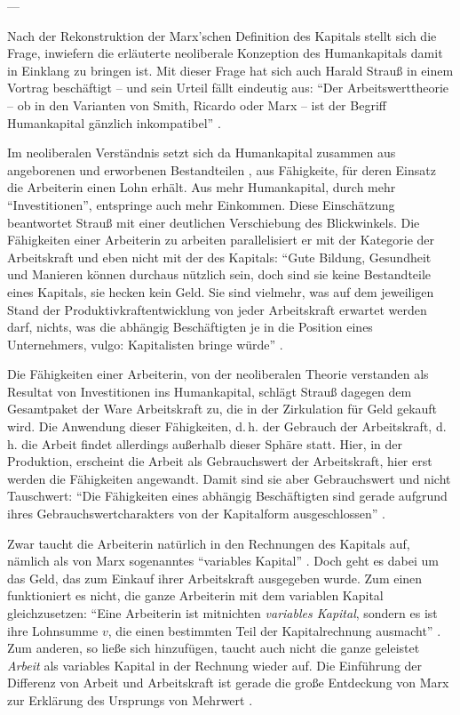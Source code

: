 \documentclass[12pt,
               DIV13,
               paper=a4,
               twoside=false,
               onehalfspacing,
               bibliography=totoc,
               toc=graduated,
               draft,
               ]{scrartcl}
\newcommand{\pc}[2]{\parencite[#1]{#2}}
\newcommand{\vgl}[2]{\parencite[vgl.][#1]{#2}}
\newcommand{\worries}[1]{\ifdraft{\textcolor{blue}{\texttt{(#1)}}}{}}
\begin{document}
---

Nach der Rekonstruktion der Marx'schen Definition des Kapitals stellt
sich die Frage, inwiefern die erläuterte neoliberale Konzeption des
Humankapitals damit in Einklang zu bringen ist. Mit dieser Frage hat
sich auch Harald Strauß in einem Vortrag beschäftigt -- und sein
Urteil fällt eindeutig aus: "`Der Arbeitswerttheorie -- ob in den
Varianten von Smith, Ricardo oder Marx -- ist der Begriff Humankapital
gänzlich inkompatibel"' \pc{124}{strauss}.

Im neoliberalen Verständnis setzt sich da Humankapital zusammen aus
angeborenen und erworbenen Bestandteilen \vgl{316}{gbp}, aus
Fähigkeite, für deren Einsatz die Arbeiterin einen Lohn erhält. Aus
mehr Humankapital, durch mehr "`Investitionen"', entspringe auch mehr
Einkommen. Diese Einschätzung beantwortet Strauß mit einer deutlichen
Verschiebung des Blickwinkels. Die Fähigkeiten einer Arbeiterin zu
arbeiten parallelisiert er mit der Kategorie der Arbeitskraft und eben
nicht mit der des Kapitals: "`Gute Bildung, Gesundheit und Manieren
können durchaus nützlich sein, doch sind sie keine Bestandteile eines
Kapitals, sie hecken kein Geld. Sie sind vielmehr, was auf dem
jeweiligen Stand der Produktivkraftentwicklung von jeder Arbeitskraft
erwartet werden darf, nichts, was die abhängig Beschäftigten je in die
Position eines Unternehmers, vulgo: Kapitalisten bringe würde"'
\pc{128}{strauss}.

Die Fähigkeiten einer Arbeiterin, von der neoliberalen Theorie
verstanden als Resultat von Investitionen ins Humankapital, schlägt
Strauß dagegen dem Gesamtpaket der Ware Arbeitskraft zu, die in der
Zirkulation für Geld gekauft wird. Die Anwendung dieser Fähigkeiten,
d.\,h. der Gebrauch der Arbeitskraft, d.\,h. die Arbeit findet
allerdings außerhalb dieser Sphäre statt. Hier, in der Produktion,
erscheint die Arbeit als Gebrauchswert der Arbeitskraft, hier erst
werden die Fähigkeiten angewandt. Damit sind sie aber Gebrauchswert
und nicht Tauschwert: "`Die Fähigkeiten eines abhängig Beschäftigten
sind gerade aufgrund ihres Gebrauchswertcharakters von der Kapitalform
ausgeschlossen"' \pc{126}{strauss}.

Zwar taucht die Arbeiterin natürlich in den Rechnungen des Kapitals
auf, nämlich als von Marx sogenanntes "`variables Kapital"'
\pc{224}{kap}. Doch geht es dabei um das Geld, das zum Einkauf ihrer
Arbeitskraft ausgegeben wurde. \worries{Stimmt das?} Zum einen funktioniert es
nicht, die ganze Arbeiterin mit dem variablen Kapital gleichzusetzen:
"`Eine Arbeiterin ist mitnichten \emph{variables Kapital}, sondern es
ist ihre Lohnsumme
$v$, die einen bestimmten Teil der Kapitalrechnung ausmacht"'
\pc{126}{strauss}. Zum anderen, so ließe sich hinzufügen, taucht auch
nicht die ganze geleistet \emph{Arbeit} als variables Kapital in der
Rechnung wieder auf. Die Einführung der Differenz von Arbeit und
Arbeitskraft ist gerade die große Entdeckung von Marx zur Erklärung
des Ursprungs von Mehrwert \vgl{xxx}{kap}.
\end{document}
